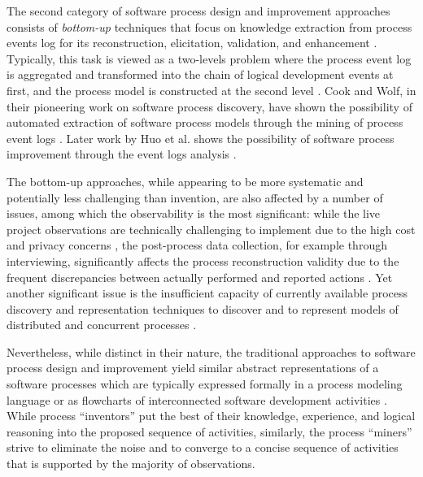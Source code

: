 The second category of software process design and improvement approaches consists of 
\textit{bottom-up} techniques that focus on knowledge extraction from process events log for 
its reconstruction, elicitation, validation, and enhancement \cite{citeulike:12944447}. 
Typically, this task is viewed as a two-levels problem where the process event log is aggregated and 
transformed into the chain of logical development events at first, 
and the process model is constructed at the second level \cite{citeulike:2703162} \cite{citeulike:12944447}.
Cook and Wolf, in their pioneering work on software process discovery, have shown the possibility of 
automated extraction of software process models through the mining of process event logs 
\cite{citeulike:328044} \cite{citeulike:5120757} \cite{citeulike:5128143}. 
Later work by Huo et al. shows the possibility of software process improvement through the event 
logs analysis \cite{citeulike:7691059} \cite{citeulike:7690766}. 

The bottom-up approaches, while appearing to be more systematic and potentially less challenging than invention, 
are also affected by a number of issues, among which the observability is the most significant: 
while the live project observations are technically challenging to implement due to the high cost and 
privacy concerns \cite{citeulike:12944447}, the post-process data collection, for example through interviewing, 
significantly affects the process reconstruction validity due to the frequent discrepancies between actually 
performed and reported actions \cite{citeulike:7691059}. 
Yet another significant issue is the insufficient capacity of currently available process discovery and 
representation techniques to discover and to represent models of distributed and concurrent processes 
\cite{citeulike:12944447}. 

Nevertheless, while distinct in their nature, the traditional approaches to software process design and 
improvement yield similar abstract representations of a software processes which are typically expressed 
formally in a process modeling language or as flowcharts of interconnected software 
development activities \cite{citeulike:12944447} \cite{citeulike:12944456}.
While process ``inventors'' put the best of their knowledge, experience, and logical reasoning into the proposed 
sequence of activities, similarly, the process ``miners'' strive to eliminate the noise and to converge to a 
concise sequence of activities that is supported by the majority of observations. 

